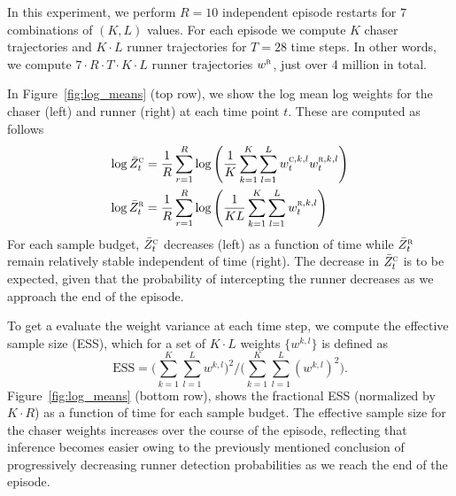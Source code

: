 \documentclass[twoside]{article}
\begin{document}
%
In this experiment, we perform $R=10$ independent episode restarts for $7$ combinations of $(K,L)$ values. For each episode we compute $K$ chaser trajectories and $K \cdot L$ runner trajectories for  $T= 28$ time steps. In other words, we compute $7 \cdot R \cdot T \cdot K \cdot L$ runner trajectories $w^{\textsc{r}}$, just over 4 million in total.

In Figure~\ref{fig:log_means} (top row), we show the log mean log weights for the chaser (left) and runner (right) at each time point $t$. These  are computed as follows 
\begin{align*}
    \log
    \bar{Z}^\textsc{c}_t 
    &=\frac{1}{R}
    \sum_{r=1}^R 
    \log 
    \left(
    \frac{1}{K}
    \sum_{k=1}^K
    \sum_{l=1}^L
    w^{\textsc{c},k,l}_t
    w^{\textsc{r},k,l}_t
    \right)
    \\
    \log
    \bar{Z}^\textsc{r}_t 
    &=\frac{1}{R}
    \sum_{r=1}^R 
    \log 
    \left(
    \frac{1}{KL}
    \sum_{k=1}^K
    \sum_{l=1}^L
    w^{\textsc{r},k,l}_t
    \right)
\end{align*}
For each sample budget, $\bar{Z}^\textsc{c}_t$ decreases (left) as a function of time while $\bar{Z}^\textsc{r}_t$ remain relatively stable independent of time (right). The decrease in $\bar{Z}^\textsc{c}_t$ is to be expected, given that the probability of intercepting the runner decreases as we approach the end of the episode.

To get a evaluate the weight variance at each time step, we compute the effective sample size (ESS), which for a set of $K \cdot L$ weights $\{w^{k,l}\}$ is defined as 
\vskip -0.1in
\[
    \textstyle \text{ESS} 
    = 
    \Big(
        \sum_{k=1}^K \sum_{l=1}^L w^{k,l} 
    \Big)^2 
    / 
    \Big( 
        \sum_{k=1}^K \sum_{l=1}^L (w^{k,l})^2
    \Big).
\]
Figure~\ref{fig:log_means} (bottom row), shows the fractional ESS %
(normalized by $K \cdot R$) %
as a function of time for each sample budget. The effective sample size for the chaser weights increases over the course of the episode, reflecting that inference becomes easier owing to the previously mentioned conclusion of progressively decreasing runner detection probabilities as we reach the end of the episode.
\end{document}
